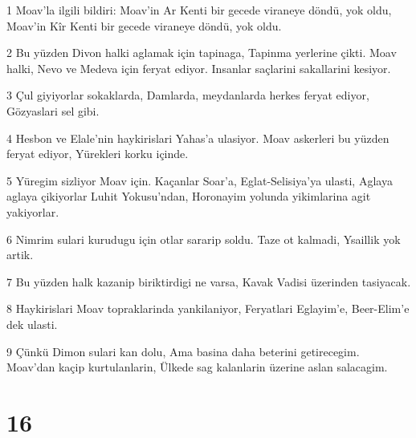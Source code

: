 \par 1 Moav'la ilgili bildiri: Moav'in Ar Kenti bir gecede viraneye döndü, yok oldu, Moav'in Kîr Kenti bir gecede viraneye döndü, yok oldu.
\par 2 Bu yüzden Divon halki aglamak için tapinaga, Tapinma yerlerine çikti. Moav halki, Nevo ve Medeva için feryat ediyor. Insanlar saçlarini sakallarini kesiyor.
\par 3 Çul giyiyorlar sokaklarda, Damlarda, meydanlarda herkes feryat ediyor, Gözyaslari sel gibi.
\par 4 Hesbon ve Elale'nin haykirislari Yahas'a ulasiyor. Moav askerleri bu yüzden feryat ediyor, Yürekleri korku içinde.
\par 5 Yüregim sizliyor Moav için. Kaçanlar Soar'a, Eglat-Selisiya'ya ulasti, Aglaya aglaya çikiyorlar Luhit Yokusu'ndan, Horonayim yolunda yikimlarina agit yakiyorlar.
\par 6 Nimrim sulari kurudugu için otlar sararip soldu. Taze ot kalmadi, Ysaillik yok artik.
\par 7 Bu yüzden halk kazanip biriktirdigi ne varsa, Kavak Vadisi üzerinden tasiyacak.
\par 8 Haykirislari Moav topraklarinda yankilaniyor, Feryatlari Eglayim'e, Beer-Elim'e dek ulasti.
\par 9 Çünkü Dimon sulari kan dolu, Ama basina daha beterini getirecegim. Moav'dan kaçip kurtulanlarin, Ülkede sag kalanlarin üzerine aslan salacagim.

\chapter{16}

